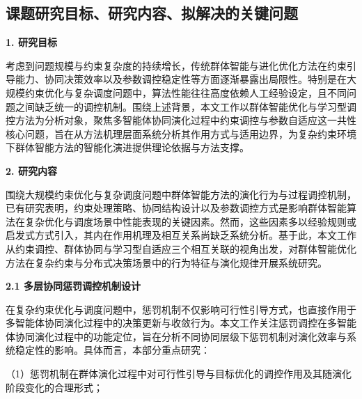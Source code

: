 \begin{titlepage}
\makeatletter
\setcounter{page}{6}
\newpage
{}
\makeatother
\section{课题研究目标、研究内容、拟解决的关键问题}

\noindent\textbf{1. 研究目标}

\par
\indent
考虑到问题规模与约束复杂度的持续增长，传统群体智能与进化优化方法在约束引导能力、协同决策效率以及参数调控稳定性等方面逐渐暴露出局限性。特别是在大规模约束优化与复杂调度问题中，算法性能往往高度依赖人工经验设定，且不同问题之间缺乏统一的调控机制。围绕上述背景，本文工作以群体智能优化与学习型调控方法为分析对象，聚焦多智能体协同演化过程中约束调控与参数自适应这一共性核心问题，旨在从方法机理层面系统分析其作用方式与适用边界，为复杂约束环境下群体智能方法的智能化演进提供理论依据与方法支撑。

\noindent\textbf{2. 研究内容}

\par
\indent
围绕大规模约束优化与复杂调度问题中群体智能方法的演化行为与过程调控机制，已有研究表明，约束处理策略、协同结构设计以及参数调控方式是影响群体智能算法在复杂优化与调度场景中性能表现的关键因素。然而，这些因素多以经验规则或启发式方式引入，其内在作用机理及相互关系尚缺乏系统分析。基于此，本文工作从约束调控、群体协同与学习型自适应三个相互关联的视角出发，对群体智能优化方法在复杂约束与分布式决策场景中的行为特征与演化规律开展系统研究。

\noindent\textbf{2.1 多层协同惩罚调控机制设计}

\par
\indent
在复杂约束优化与调度问题中，惩罚机制不仅影响可行性引导方式，也直接作用于多智能体协同演化过程中的决策更新与收敛行为。本文工作关注惩罚调控在多智能体协同演化过程中的功能定位，旨在分析不同协同层级下惩罚机制对演化效率与系统稳定性的影响。具体而言，本部分重点研究：

\par
\indent
（1）惩罚机制在群体演化过程中对可行性引导与目标优化的调控作用及其随演化阶段变化的合理形式；


\end{titlepage}
